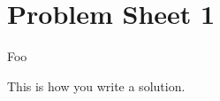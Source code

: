 \section*{Problem Sheet 1}
\setcounter{PS}{1}

\begin{boxproblem}
    Foo
\end{boxproblem}
\begin{solution}
    This is how you write a solution.
\end{solution}